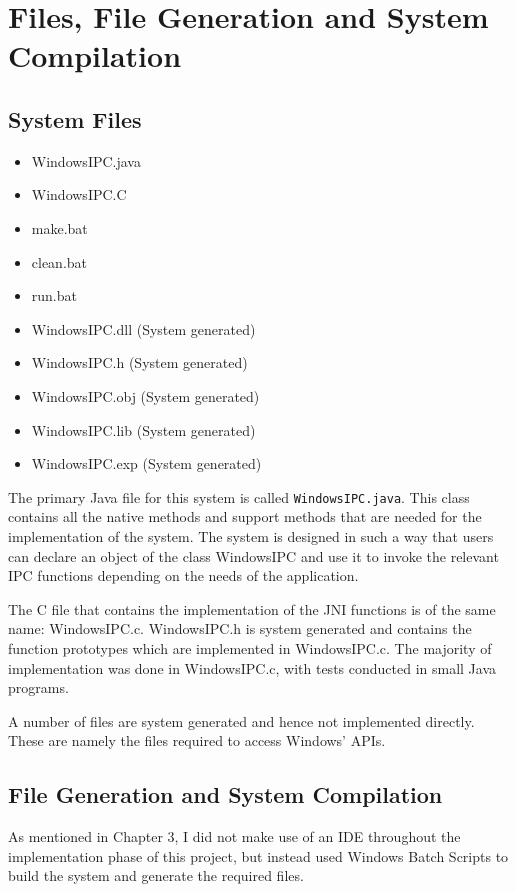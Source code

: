 \documentclass[12pt] {newrucsthesis}    %
\def\code#1{\texttt{#1}}
\begin{document}
    \section{Files, File Generation and System Compilation} \label{syscomp}
      \subsection{System Files}
        \begin{itemize}
          \item WindowsIPC.java
          \item WindowsIPC.C
          \item make.bat
          \item clean.bat
          \item run.bat
          \item WindowsIPC.dll (System generated)
          \item WindowsIPC.h (System generated)
          \item WindowsIPC.obj (System generated)
          \item WindowsIPC.lib (System generated)
          \item WindowsIPC.exp (System generated)
        \end{itemize}

        The primary Java file for this system is called \code{WindowsIPC.java}.
        This class contains all the native methods and support methods that are needed for the implementation
        of the system. The system is designed in such a way that users can declare an object of the class
        WindowsIPC and use it to invoke the relevant IPC functions depending on the needs of the application.

        The C file that contains the implementation of the JNI functions is of the same name:
        WindowsIPC.c. WindowsIPC.h is system generated and contains the function prototypes which are implemented in
        WindowsIPC.c. The majority of implementation was done in WindowsIPC.c, with tests conducted in small Java
        programs.

        A number of files are system generated and hence not implemented directly. These are namely the files required
        to access Windows' APIs.

      \subsection{File Generation and System Compilation}
        As mentioned in Chapter 3, I did not make use of an IDE throughout the implementation phase of this
        project, but instead used Windows Batch Scripts to build the system and generate the required files.
\end{document}
